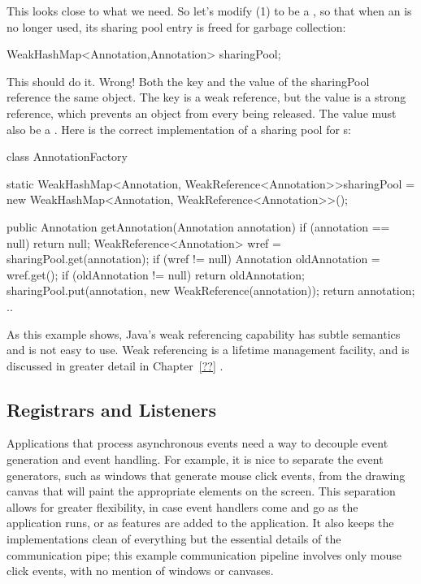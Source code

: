 This looks close to what we need. So let's modify (1) to be a
, so that when an  is no longer used,
 its sharing pool entry is freed for
garbage collection:
\begin{shortlisting}
   WeakHashMap<Annotation,Annotation> sharingPool;     
\end{shortlisting}
This should do it. Wrong! Both the key and the value of the sharingPool
 reference the same  object. The key is a
weak reference, but the value is a strong reference, which prevents an
 object from every being released. The value must also be a
. Here is the correct
implementation of a sharing pool for s:
\begin{shortlisting}
class AnnotationFactory {
   static WeakHashMap<Annotation, WeakReference<Annotation>>sharingPool = 
                   new WeakHashMap<Annotation, WeakReference<Annotation>>();
    
    public Annotation getAnnotation(Annotation annotation) {
        if (annotation == null) return null;
        WeakReference<Annotation> wref = sharingPool.get(annotation);
        if (wref != null) {
            Annotation oldAnnotation = wref.get();
            if (oldAnnotation != null) {
                return oldAnnotation;
            }
        }
        sharingPool.put(annotation, new WeakReference(annotation));
        return annotation;
    }
    ..
}
\end{shortlisting}

As this example shows,  Java's weak referencing capability has subtle
semantics and is not easy to use. Weak referencing is a lifetime management
facility, and is discussed in greater detail in Chapter~\ref{??} .


\subsection{Registrars and Listeners}

Applications that process asynchronous events need a way to decouple event
generation and event handling. For example, it is nice to separate the event
generators, such as windows that generate mouse click events, from the drawing
canvas that will paint the appropriate elements on the screen. This separation
allows for greater flexibility, in case event handlers come and go as the
application runs, or as features are added to the application. It also keeps the
implementations clean of everything but the essential details of the
communication pipe; this example communication pipeline involves only mouse
click events, with no mention of windows or canvases.

